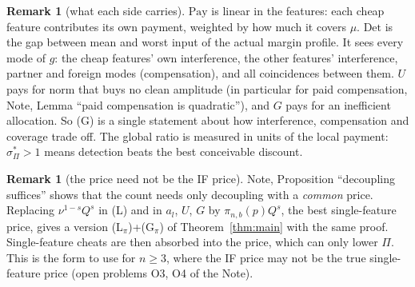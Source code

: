 \documentclass[11pt]{article}
\theoremstyle{definition}
\newtheorem{remark}[theorem]{Remark}
\begin{document}
\begin{remark}[what each side carries]
$\mathrm{Pay}$ is linear in the features: each cheap feature contributes its own payment, weighted by how much it covers $\mu$.
$\mathrm{Det}$ is the gap between mean and worst input of the actual margin profile.  It sees every mode of $g$: the cheap features'
own interference, the other features' interference, partner and foreign modes (compensation), and all coincidences between them.
$U$ pays for norm that buys no clean amplitude (in particular for paid compensation, Note, Lemma ``paid compensation is
quadratic''), and $G$ pays for an inefficient allocation.  So (G) is a single statement about how interference, compensation and
coverage trade off.  The global ratio is measured in units of the local payment: $\sigma^*_\Pi>1$ means detection beats the best
conceivable discount.
\end{remark}

\begin{remark}[the price need not be the IF price]
Note, Proposition ``decoupling suffices'' shows that the count needs only decoupling with a \emph{common} price.  Replacing
$\nu^{1-s}Q^s$ in (L) and in $a_l$, $U$, $G$ by $\pi_{n,b}(p)Q^s$, the best single-feature price, gives a version (L$_\pi$)+(G$_\pi$) of
Theorem~\ref{thm:main} with the same proof.  Single-feature cheats are then absorbed into the price, which can only lower $\Pi$.  This is
the form to use for $n\ge3$, where the IF price may not be the true single-feature price (open problems O3, O4 of the Note).
\end{remark}
\end{document}
